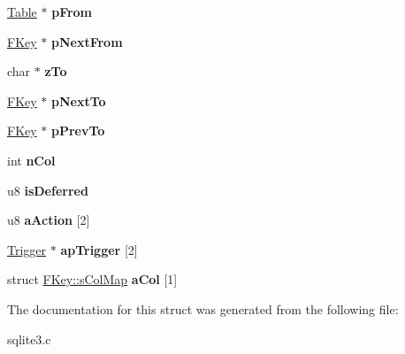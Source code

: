 \begin{DoxyCompactItemize}
\item 
\hyperlink{structTable}{Table} $\ast$ {\bfseries p\+From}\hypertarget{structFKey_a6d476f3fbfa75a19c5c5a9edec4e79eb}{}\label{structFKey_a6d476f3fbfa75a19c5c5a9edec4e79eb}

\item 
\hyperlink{structFKey}{F\+Key} $\ast$ {\bfseries p\+Next\+From}\hypertarget{structFKey_ac64ff66b30167715c8822a74c2809075}{}\label{structFKey_ac64ff66b30167715c8822a74c2809075}

\item 
char $\ast$ {\bfseries z\+To}\hypertarget{structFKey_a1eac10bab38a0ac9f88306fbbabbe5d6}{}\label{structFKey_a1eac10bab38a0ac9f88306fbbabbe5d6}

\item 
\hyperlink{structFKey}{F\+Key} $\ast$ {\bfseries p\+Next\+To}\hypertarget{structFKey_ac29b26999113602e7e3921bf07643c04}{}\label{structFKey_ac29b26999113602e7e3921bf07643c04}

\item 
\hyperlink{structFKey}{F\+Key} $\ast$ {\bfseries p\+Prev\+To}\hypertarget{structFKey_a56189e420e91df86513e6895db518eca}{}\label{structFKey_a56189e420e91df86513e6895db518eca}

\item 
int {\bfseries n\+Col}\hypertarget{structFKey_a611e3223f3f434e0a635e036dc100cbb}{}\label{structFKey_a611e3223f3f434e0a635e036dc100cbb}

\item 
u8 {\bfseries is\+Deferred}\hypertarget{structFKey_ab742714b17f2c13353837e1fdde51cc7}{}\label{structFKey_ab742714b17f2c13353837e1fdde51cc7}

\item 
u8 {\bfseries a\+Action} \mbox{[}2\mbox{]}\hypertarget{structFKey_a68a08f58294bf845e9c77d785499d222}{}\label{structFKey_a68a08f58294bf845e9c77d785499d222}

\item 
\hyperlink{structTrigger}{Trigger} $\ast$ {\bfseries ap\+Trigger} \mbox{[}2\mbox{]}\hypertarget{structFKey_a9ce15cb27b675836bc714ab18fd8a008}{}\label{structFKey_a9ce15cb27b675836bc714ab18fd8a008}

\item 
struct \hyperlink{structFKey_1_1sColMap}{F\+Key\+::s\+Col\+Map} {\bfseries a\+Col} \mbox{[}1\mbox{]}\hypertarget{structFKey_a5b230bc6c10a67f432ed7d5ebc92bcd2}{}\label{structFKey_a5b230bc6c10a67f432ed7d5ebc92bcd2}

\end{DoxyCompactItemize}


The documentation for this struct was generated from the following file\+:\begin{DoxyCompactItemize}
\item 
sqlite3.\+c\end{DoxyCompactItemize}
